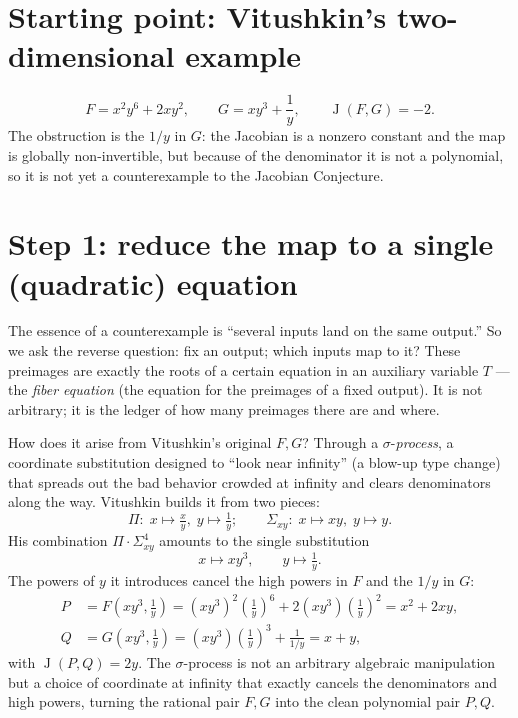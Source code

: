 \documentclass[11pt]{article}
\theoremstyle{plain}
\theoremstyle{definition}
\DeclareMathOperator{\Jdet}{J}
\begin{document}
\section*{Starting point: Vitushkin's two-dimensional example}
\[
  F = x^2y^6+2xy^2,\qquad G = xy^3+\frac{1}{y},\qquad \Jdet(F,G)=-2 .
\]
The obstruction is the $1/y$ in $G$: the Jacobian is a nonzero constant and
the map is globally non-invertible, but because of the denominator it is not
a polynomial, so it is not yet a counterexample to the Jacobian Conjecture.

\section*{Step 1: reduce the map to a single (quadratic) equation}
The essence of a counterexample is ``several inputs land on the same
output.'' So we ask the reverse question: fix an output; which inputs map to
it? These preimages are exactly the roots of a certain equation in an
auxiliary variable $T$ --- the \emph{fiber equation} (the equation for the
preimages of a fixed output). It is not arbitrary; it is the ledger of how
many preimages there are and where.

How does it arise from Vitushkin's original $F,G$? Through a
$\sigma$-\emph{process}, a coordinate substitution designed to ``look near
infinity'' (a blow-up type change) that spreads out the bad behavior
crowded at infinity and clears denominators along the way. Vitushkin builds
it from two pieces:
\[
  \Pi:\; x\mapsto \tfrac{x}{y},\; y\mapsto \tfrac1y;
  \qquad
  \Sigma_{xy}:\; x\mapsto xy,\; y\mapsto y .
\]
His combination $\Pi\cdot\Sigma_{xy}^4$ amounts to the single substitution
\[
  x\mapsto xy^3,\qquad y\mapsto \tfrac1y .
\]
The powers of $y$ it introduces cancel the high powers in $F$ and the $1/y$
in $G$:
\[
\begin{aligned}
  P &= F\!\left(xy^3,\tfrac1y\right)
     = (xy^3)^2\!\left(\tfrac1y\right)^6+2(xy^3)\!\left(\tfrac1y\right)^2
     = x^2+2xy,\\[2pt]
  Q &= G\!\left(xy^3,\tfrac1y\right)
     = (xy^3)\!\left(\tfrac1y\right)^3+\frac{1}{1/y}
     = x+y,
\end{aligned}
\]
with $\Jdet(P,Q)=2y$. The $\sigma$-process is not an arbitrary algebraic
manipulation but a choice of coordinate at infinity that exactly cancels the
denominators and high powers, turning the rational pair $F,G$ into the clean
polynomial pair $P,Q$.
\end{document}
